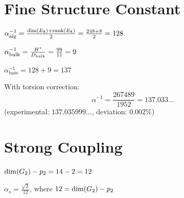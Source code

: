 \section{Fine Structure Constant}

\begin{definition}\label{def:alpha_inv_algebraic}
    \leanok
    $\alpha^{-1}_{\mathrm{alg}} = \frac{\mathrm{dim}(E_8) + \mathrm{rank}(E_8)}{2} = \frac{248 + 8}{2} = 128$
\end{definition}

\begin{definition}\label{def:alpha_inv_bulk}
    \leanok
    $\alpha^{-1}_{\mathrm{bulk}} = \frac{H^*}{D_{\mathrm{bulk}}} = \frac{99}{11} = 9$
\end{definition}

\begin{theorem}\label{thm:alpha_inv_base}
    \leanok
    $\alpha^{-1}_{\mathrm{base}} = 128 + 9 = 137$
\end{theorem}

\begin{theorem}\label{thm:alpha_inv_complete}
    \leanok
    With torsion correction:
    \[
        \alpha^{-1} = \frac{267489}{1952} = 137.033...
    \]
    (experimental: $137.035999...$, deviation: 0.002\%)
\end{theorem}

\section{Strong Coupling}

\begin{definition}\label{def:alpha_s_denom}
    \leanok
    $\mathrm{dim}(G_2) - p_2 = 14 - 2 = 12$
\end{definition}

\begin{theorem}\label{thm:alpha_s_structure}
    \leanok
    $\alpha_s = \frac{\sqrt{2}}{12}$, where $12 = \mathrm{dim}(G_2) - p_2$
\end{theorem}

